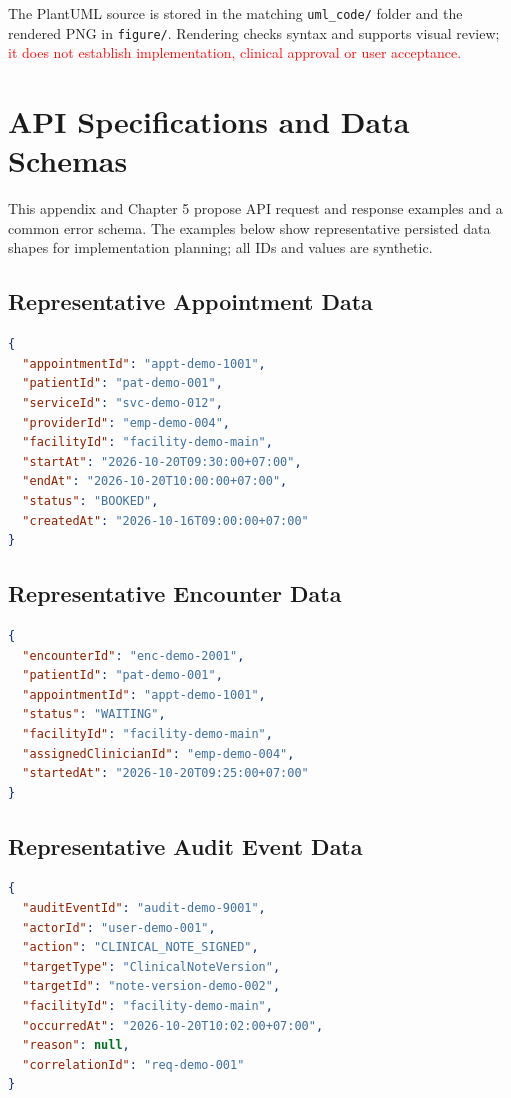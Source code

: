 \documentclass[a4paper,12pt]{article}
\newcommand{\code}[1]{\nolinkurl{#1}}
\newcommand{\weak}[1]{\textcolor{red}{#1}}
\begin{document}
The PlantUML source is stored in the matching \code{uml_code/} folder and the rendered PNG in \code{figure/}. Rendering checks syntax and supports visual review; \weak{it does not establish implementation, clinical approval or user acceptance.}

\section{API Specifications and Data Schemas}
\label{sec:api-data-schemas}
This appendix and Chapter 5 propose API request and response examples and a common error schema. The examples below show representative persisted data shapes for implementation planning; all IDs and values are synthetic.

\subsection{Representative Appointment Data}
\begin{lstlisting}[language=json,caption={Proposed Appointment resource shape},label={lst:appointment-resource}]
{
  "appointmentId": "appt-demo-1001",
  "patientId": "pat-demo-001",
  "serviceId": "svc-demo-012",
  "providerId": "emp-demo-004",
  "facilityId": "facility-demo-main",
  "startAt": "2026-10-20T09:30:00+07:00",
  "endAt": "2026-10-20T10:00:00+07:00",
  "status": "BOOKED",
  "createdAt": "2026-10-16T09:00:00+07:00"
}
\end{lstlisting}

\subsection{Representative Encounter Data}
\begin{lstlisting}[language=json,caption={Proposed Encounter resource shape},label={lst:encounter-resource}]
{
  "encounterId": "enc-demo-2001",
  "patientId": "pat-demo-001",
  "appointmentId": "appt-demo-1001",
  "status": "WAITING",
  "facilityId": "facility-demo-main",
  "assignedClinicianId": "emp-demo-004",
  "startedAt": "2026-10-20T09:25:00+07:00"
}
\end{lstlisting}

\subsection{Representative Audit Event Data}
\begin{lstlisting}[language=json,caption={Proposed audit event shape with no clinical payload duplication},label={lst:audit-event-resource}]
{
  "auditEventId": "audit-demo-9001",
  "actorId": "user-demo-001",
  "action": "CLINICAL_NOTE_SIGNED",
  "targetType": "ClinicalNoteVersion",
  "targetId": "note-version-demo-002",
  "facilityId": "facility-demo-main",
  "occurredAt": "2026-10-20T10:02:00+07:00",
  "reason": null,
  "correlationId": "req-demo-001"
}
\end{lstlisting}
\end{document}
